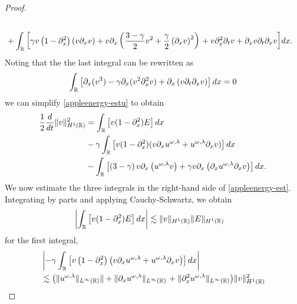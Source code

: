 \begin{proof}
\begin{equation}
\begin{split}
\\
&+  \int_{\mathbb{R}}
\left[ \gamma v \left( 1-\partial_x^2 \right)\left( v \partial_x v \right) + v
\partial_x \left( \frac{3-\gamma}{2} v^2 + \frac{\gamma}{2}\left( \partial_x v \right)^2
\right) \right . +  v \partial_x^2 \partial_t v + \partial_x v \partial_t \partial_x v\bigg]dx.
\end{split}
\end{equation}
Noting that the the last integral can be rewritten as 
\begin{equation*}
\begin{split}
\int_{\mathbb{R}} \left[ \partial_x (v^3) - \gamma \partial_x (v^2 \partial_x^2 v) + \partial_x\left( v \partial_t
\partial_x v
\right) \right]dx  = 0
\end{split}
\end{equation*}
%
we can simplify \eqref{appleenergy-estu} to obtain
%
%
\begin{equation}
\label{appleenergy-est}
\begin{split}
\frac{1}{2} \frac{d}{dt} \|v\|_{H^1(\mathbb{R})}^2  
& = 
\int_{\mathbb{R}} \left[ v(1-\partial_x^2)E \right]dx\\
&-
\gamma \int_{\mathbb{R}} \left[ v(1-\partial_x^2)(v\partial_x u^{\omega,\lambda} + 
u^{\omega,\lambda} \partial_x v) \right]dx
\\
&- \int_{\mathbb{R}}\left[ \left( 3-\gamma \right)v \partial_x\left( u^{\omega,\lambda}v 
\right) + \gamma v
\partial_x \left( \partial_x u^{\omega,\lambda} \partial_x v \right)\right]dx.
\end{split}
\end{equation}
%
%
We now estimate the three integrals in the right-hand side of 
\eqref{appleenergy-est}. Integrating by parts and applying Cauchy-Schwartz,  
we obtain
%
%
%
\begin{equation}
\begin{split}
\label{applefirst_piece}
& \left |\int_{\mathbb{R}} \left [v (1- \partial_x^2)E \right ] dx \right |
\lesssim
\|v\|_{H^1(\mathbb{R})} \|E\|_{H^1(\mathbb{R})}
\end{split}
\end{equation}
for the first integral,
%
%
\begin{equation}
\begin{split}
\label{applesecond-piece-final}
& \left | -\gamma \int_{\rr}
\left[ v\left( 1-\p_x^2 \right)\left( v \p_x u^{\omega,\lambda} + 
u^{\omega,\lambda} \p_x v
\right) \right] dx \right |
\\
& \lesssim \left( \|u^{\omega,\lambda}\|_{L^\infty(\rr)}\| + \|\p_x 
u^{\omega,\lambda}
\|_{L^\infty(\rr)} \right .  + \|\p_x^2 u^{\omega,\lambda} 
\|_{L^\infty(\rr)}
\big )\|v\|_{H^1(\rr)}^2
\end{split}

\end{equation}
\end{proof}
